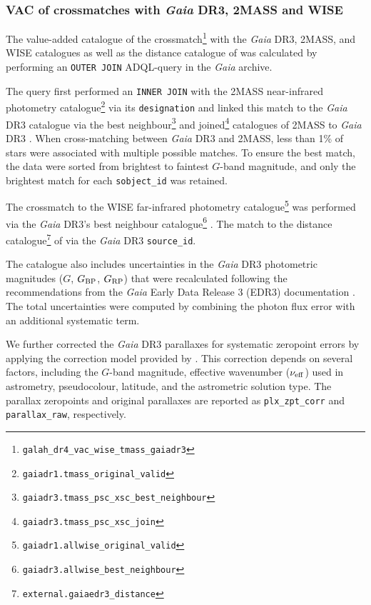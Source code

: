\documentclass[
  journal=pasa,
  manuscript=research-paper, %
  year=2024,
  volume=37
]{cup-journal}
\newcommand{\Gaia}{\textit{Gaia}\xspace}
\begin{document}
\subsubsection{VAC of crossmatches with \Gaia DR3, 2MASS and WISE} \label{sec:vac_crossmatch}

The value-added catalogue of the crossmatch\footnote{\texttt{galah\_dr4\_vac\_wise\_tmass\_gaiadr3}} with the \Gaia DR3, 2MASS, and WISE catalogues as well as the distance catalogue of \citet{BailerJones2021} was calculated by performing an \texttt{OUTER JOIN} ADQL-query in the \Gaia archive. 

The query first performed an \texttt{INNER JOIN} with the 2MASS near-infrared photometry catalogue\footnote{\texttt{gaiadr1.tmass\_original\_valid}} via its \texttt{designation} and linked this match to the \Gaia DR3 catalogue via the best neighbour\footnote{ \texttt{gaiadr3.tmass\_psc\_xsc\_best\_neighbour}} and joined\footnote{\texttt{gaiadr3.tmass\_psc\_xsc\_join}} catalogues of 2MASS to \Gaia DR3 \citep{Torra2021}. When cross-matching between \Gaia DR3 and 2MASS, less than 1\% of stars were associated with multiple possible matches. To ensure the best match, the data were sorted from brightest to faintest \(G\)-band magnitude, and only the brightest match for each \texttt{sobject\_id} was retained.

The crossmatch to the WISE far-infrared photometry catalogue\footnote{\texttt{gaiadr1.allwise\_original\_valid}} \citep{Cutri2013} was performed via the \Gaia DR3's best neighbour catalogue\footnote{\texttt{gaiadr3.allwise\_best\_neighbour}} \citep{Torra2021}. The match to the distance catalogue\footnote{\texttt{external.gaiaedr3\_distance}} of \citet{BailerJones2021}  via the \Gaia DR3 \texttt{source\_id}.

The catalogue also includes uncertainties in the \Gaia DR3 photometric magnitudes (\(G\), \(G_{\rm BP}\), \(G_{\rm RP}\)) that were recalculated following the recommendations from the \Gaia Early Data Release 3 (EDR3) documentation \citep{Riello2021}. The total uncertainties were computed by combining the photon flux error with an additional systematic term.

We further corrected the \Gaia DR3 parallaxes for systematic zeropoint errors by applying the correction model provided by \citet{Lindegren2021b}. This correction depends on several factors, including the \(G\)-band magnitude, effective wavenumber (\(\nu_{\rm eff}\)) used in astrometry, pseudocolour, latitude, and the astrometric solution type. The parallax zeropoints and original parallaxes are reported as \texttt{plx\_zpt\_corr} and \texttt{parallax\_raw}, respectively.
\end{document}
